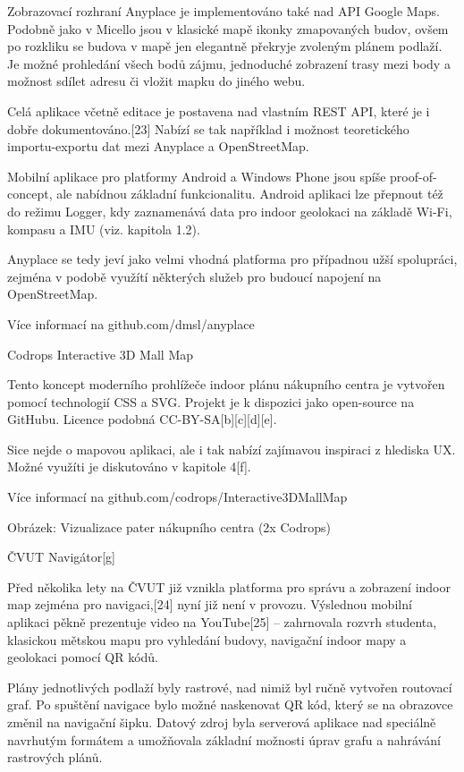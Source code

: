 Zobrazovací rozhraní Anyplace je implementováno také nad API Google Maps. Podobně jako v Micello jsou v klasické mapě ikonky zmapovaných budov, ovšem po rozkliku se budova v mapě jen elegantně překryje zvoleným plánem podlaží. Je možné prohledání všech bodů zájmu, jednoduché zobrazení trasy mezi body a možnost sdílet adresu či vložit mapku do jiného webu.

Celá aplikace včetně editace je postavena nad vlastním REST API, které je i dobře dokumentováno.[23] Nabízí se tak například i možnost teoretického importu-exportu dat mezi Anyplace a OpenStreetMap.

Mobilní aplikace pro platformy Android a Windows Phone jsou spíše proof-of-concept, ale nabídnou základní funkcionalitu. Android aplikaci lze přepnout též do režimu Logger, kdy zaznamenává data pro indoor geolokaci na základě Wi-Fi, kompasu a IMU (viz. kapitola 1.2).

Anyplace se tedy jeví jako velmi vhodná platforma pro případnou užší spolupráci, zejména v podobě využítí některých služeb pro budoucí napojení na OpenStreetMap.

Více informací na github.com/dmsl/anyplace 

Codrops Interactive 3D Mall Map



Tento koncept moderního prohlížeče indoor plánu nákupního centra je vytvořen pomocí technologií CSS a SVG. Projekt je k dispozici jako open-source na GitHubu. Licence podobná CC-BY-SA[b][c][d][e].

Sice nejde o mapovou aplikaci, ale i tak nabízí zajímavou inspiraci z hlediska UX. Možné využíti je diskutováno v kapitole 4[f].

Více informací na github.com/codrops/Interactive3DMallMap



Obrázek: Vizualizace pater nákupního centra (2x Codrops)

ČVUT Navigátor[g]



Před několika lety na ČVUT již vznikla platforma pro správu a zobrazení indoor map zejména pro navigaci,[24] nyní již není v provozu. Výslednou mobilní aplikaci pěkně prezentuje video na YouTube[25] – zahrnovala rozvrh studenta, klasickou mětskou mapu pro vyhledání budovy, navigační indoor mapy a geolokaci pomocí QR kódů.

Plány jednotlivých podlaží byly rastrové, nad nimiž byl ručně vytvořen routovací graf. Po spuštění navigace bylo možné naskenovat QR kód, který se na obrazovce změnil na navigační šipku. Datový zdroj byla serverová aplikace nad speciálně navrhutým formátem a umožňovala základní možnosti úprav grafu a nahrávání rastrových plánů.

